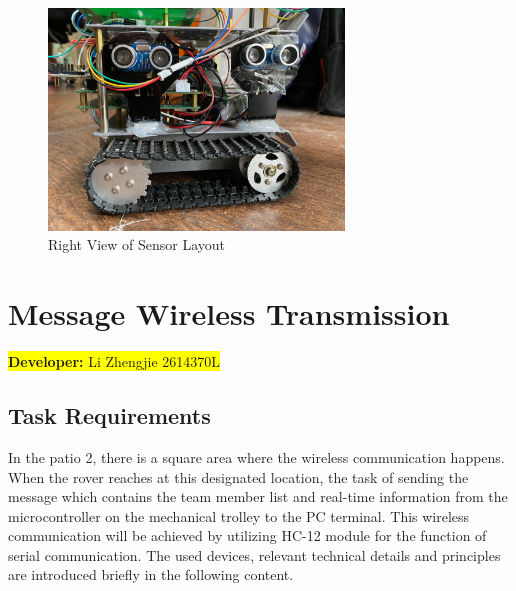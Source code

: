 \documentclass[12pt, a4paper, oneside]{report}
\begin{document}
\begin{figure}[H]
  \centering
  \includegraphics[width=0.7\textwidth]{pic/HC-SR04/right view.jpg}
  \caption{Right View of Sensor Layout}
  \label{fig:Right View of Sensor Layout}
\end{figure}

\newpage
\section{Message Wireless Transmission}\label{sec:hc12}
\colorbox{yellow}{\textbf{Developer:} Li Zhengjie 2614370L}

\subsection{Task Requirements}
In the patio 2, there is a square area where the wireless communication happens. When the rover reaches at this designated location, the task of sending the message which contains the team member list and real-time information from the microcontroller on the mechanical trolley to the PC terminal. This wireless communication will be achieved by utilizing HC-12 module for the function of serial communication. The used devices, relevant technical details and principles are introduced briefly in the following content.  
\end{document}
